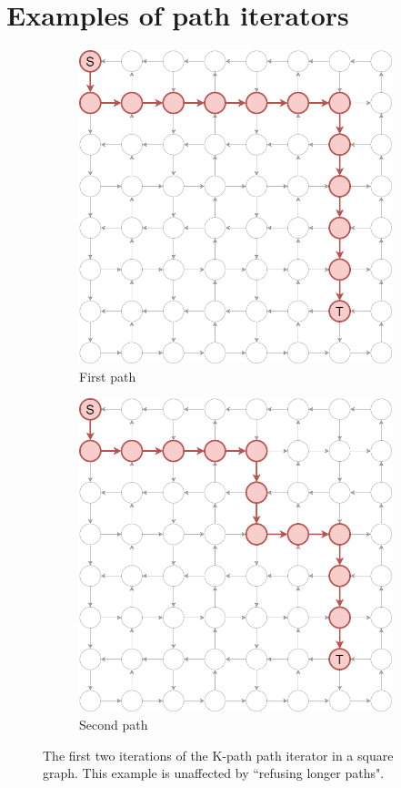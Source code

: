 \section{Examples of path iterators}
\begin{figure}[ht]
\begin{subfigure}{.5\textwidth}
  \centering
\includegraphics[width=0.8\linewidth]{images/pathiterators/examples-kpath-1.png}
  \caption{First path}
\end{subfigure}
\begin{subfigure}{.5\textwidth}
  \centering
\includegraphics[width=0.8\linewidth]{images/pathiterators/examples-kpath-2.png}
  \caption{Second path}
\end{subfigure}
\caption{The first two iterations of the K-path path iterator in a square graph. This example is unaffected by ``refusing longer paths".}
\label{fig:pathexamples-kpath}
\end{figure}


